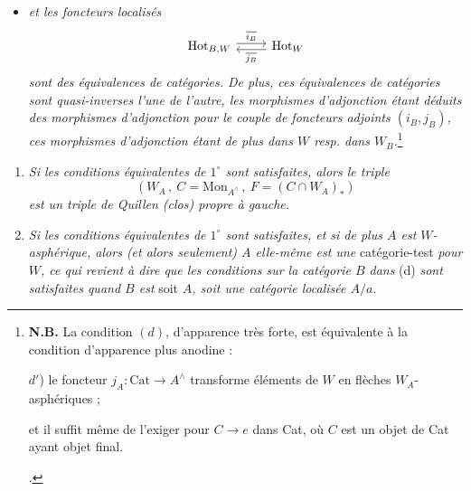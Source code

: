 \documentclass[11pt]{article}
\newcommand{\printedpage}[1]{\marginpar{\footnotesize p.~#1}}
\newcommand{\msp}[1]{\marginpar{\footnotesize [#1]}}
\begin{document}
\printedpage{59}

\begin{itemize}[label={},leftmargin=4.5em]
\item \textit{et les foncteurs localisés}
\[
\begin{tikzcd}
\mathrm{Hot}_{B,W} \arrow[r, shift left, "\overline{i_B}"] & \mathrm{Hot}_W \arrow[l, shift left, "\overline{j_B}"]
\end{tikzcd}
\]
\textit{sont des équivalences de catégories. De plus, ces équivalences de catégories sont quasi-inverses l'une de l'autre, les morphismes d'adjonction étant déduits des morphismes d'adjonction pour le couple de foncteurs adjoints $(i_B, j_B)$, ces morphismes d'adjonction étant de plus dans $W$ resp. dans $W_B$.}\footnote[38]{\textbf{N.B.} La condition $(d)$, d'apparence très forte, est équivalente à la condition d'apparence plus anodine :\par
$d'$) le foncteur $j_A : \mathrm{Cat} \longrightarrow A^\wedge$ transforme éléments de $W$ en flèches $W_A$-asphériques ;\par\noindent
et il suffit même de l'exiger pour $C \longrightarrow e$ dans Cat, où $C$ est un objet de Cat ayant objet final.\par\noindent
.}
\end{itemize}

\msp{page 107}

\begin{enumerate}[leftmargin=2.5em]
\item[$2^\circ$)] \textit{Si les conditions équivalentes de $1^\circ$ sont satisfaites, alors le triple}
\[
(W_A\,,\ C = \mathrm{Mon}_{A^\wedge}\,,\ F = (C \cap W_A)_*)
\]
\textit{est un triple de Quillen (clos) propre à gauche.}
\item[$3^\circ$)] \textit{Si les conditions équivalentes de $1^\circ$ sont satisfaites, et si de plus $A$ est $W$-asphérique, alors (et alors seulement) $A$ elle-même est une} catégorie-test \textit{pour $W$, ce qui revient à dire que les conditions sur la catégorie $B$ dans} (d) \textit{sont satisfaites quand $B$ est} soit \textit{$A$, soit une catégorie localisée $A/a$.}
\end{enumerate}
\end{document}
